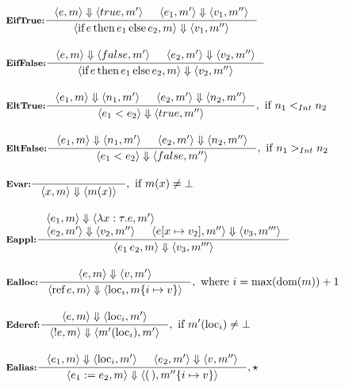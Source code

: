 \documentclass[12pt]{article}
\newcommand{\spacing}{1em}
\begin{document}
\begin{align}
{}
\\[\spacing]
&\inference[\textbf{EifTrue:}]{
    \langle e, m \rangle \Downarrow \langle true, m' \rangle &
    \langle e_1, m' \rangle \Downarrow \langle v_1, m'' \rangle
}{
    \langle \textrm{if}\, e\, \textrm{then}\, e_1\, \textrm{else}\, e_2, m \rangle 
        \Downarrow \langle v_1, m''  \rangle
}
\\[\spacing]
&\inference[\textbf{EifFalse:}]{
    \langle e, m \rangle \Downarrow \langle false, m' \rangle &
    \langle e_2, m' \rangle \Downarrow \langle v_2, m'' \rangle
}{
    \langle \textrm{if}\, e\, \textrm{then}\, e_1\, \textrm{else}\, e_2, m \rangle 
        \Downarrow \langle v_2, m''  \rangle
}
\\[\spacing]
&\inference[\textbf{EltTrue:}]{
    \langle e_1, m \rangle \Downarrow \langle n_1, m' \rangle &
    \langle e_2, m' \rangle \Downarrow \langle n_2, m'' \rangle
}{
    \langle e_1 < e_2 \rangle \Downarrow \langle true, m''  \rangle
}, ~\textrm{if}~ n_1 <_{Int} n_2
\\[\spacing]
&\inference[\textbf{EltFalse:}]{
    \langle e_1, m \rangle \Downarrow \langle n_1, m' \rangle &
    \langle e_2, m' \rangle \Downarrow \langle n_2, m'' \rangle
}{
    \langle e_1 < e_2 \rangle \Downarrow \langle false, m''  \rangle
}, ~\textrm{if}~ n_1 >_{Int} n_2
\\[\spacing]
&\inference[\textbf{Evar:}]{}{
    \langle x, m \rangle \Downarrow \langle m(x) \rangle
}, ~\textrm{if}~ m(x) \neq \bot
\\[\spacing]
&\inference[\textbf{Eappl:}]{
    \langle e_1, m \rangle \Downarrow \langle \lambda x : \tau . e , m' \rangle & \hfill\\
    \langle e_2, m' \rangle \Downarrow \langle v_2, m'' \rangle &
    \langle e[x \mapsto v_2], m'' \rangle \Downarrow \langle v_3, m''' \rangle
}{
    \langle e_1 \, e_2, m \rangle \Downarrow \langle v_3, m'''  \rangle
}
\\[\spacing]
&\inference[\textbf{Ealloc:}]{
    \langle e, m \rangle \Downarrow \langle v, m' \rangle
}{
    \langle \textrm{ref}\, e, m \rangle \Downarrow \langle \textrm{loc}_i, m\{i \mapsto v\}  \rangle
},~\textrm{where}~ i = \textrm{max}(\textrm{dom}(m)) + 1
\\[\spacing]
&\inference[\textbf{Ederef:}]{
    \langle e, m \rangle \Downarrow \langle \textrm{loc}_i, m' \rangle
}{
    \langle !e, m \rangle \Downarrow \langle m'(\textrm{loc}_i), m'  \rangle
},~\textrm{if}~ m'(\textrm{loc}_i) \neq \bot
\\[\spacing]
&\inference[\textbf{Ealias:}]{\label{eq:Ealias}
    \langle e_1, m \rangle \Downarrow \langle \textrm{loc}_i, m' \rangle &
    \langle e_2, m' \rangle \Downarrow \langle v, m'' \rangle
}{
    \langle e_1 := e_2, m \rangle \Downarrow \langle (\,), m''\{i \mapsto v\}  \rangle
}, \star
\end{align}
\end{document}
